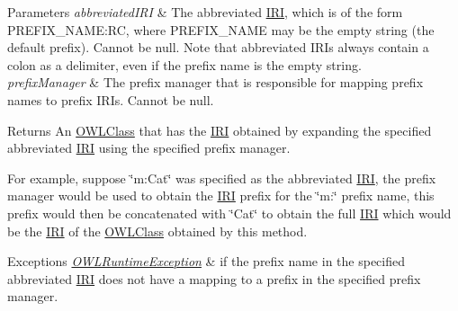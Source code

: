 \begin{DoxyParams}{Parameters}
{\em abbreviated\-I\-R\-I} & The abbreviated \hyperlink{classorg_1_1semanticweb_1_1owlapi_1_1model_1_1_i_r_i}{I\-R\-I}, which is of the form P\-R\-E\-F\-I\-X\-\_\-\-N\-A\-M\-E\-:R\-C, where P\-R\-E\-F\-I\-X\-\_\-\-N\-A\-M\-E may be the empty string (the default prefix). Cannot be null. Note that abbreviated I\-R\-Is always contain a colon as a delimiter, even if the prefix name is the empty string. \\
\hline
{\em prefix\-Manager} & The prefix manager that is responsible for mapping prefix names to prefix I\-R\-Is. Cannot be null. \\
\hline
\end{DoxyParams}
\begin{DoxyReturn}{Returns}
An \hyperlink{interfaceorg_1_1semanticweb_1_1owlapi_1_1model_1_1_o_w_l_class}{O\-W\-L\-Class} that has the \hyperlink{classorg_1_1semanticweb_1_1owlapi_1_1model_1_1_i_r_i}{I\-R\-I} obtained by expanding the specified abbreviated \hyperlink{classorg_1_1semanticweb_1_1owlapi_1_1model_1_1_i_r_i}{I\-R\-I} using the specified prefix manager. 
\end{DoxyReturn}
For example, suppose \char`\"{}m\-:\-Cat\char`\"{} was specified as the abbreviated \hyperlink{classorg_1_1semanticweb_1_1owlapi_1_1model_1_1_i_r_i}{I\-R\-I}, the prefix manager would be used to obtain the \hyperlink{classorg_1_1semanticweb_1_1owlapi_1_1model_1_1_i_r_i}{I\-R\-I} prefix for the \char`\"{}m\-:\char`\"{} prefix name, this prefix would then be concatenated with \char`\"{}\-Cat\char`\"{} to obtain the full \hyperlink{classorg_1_1semanticweb_1_1owlapi_1_1model_1_1_i_r_i}{I\-R\-I} which would be the \hyperlink{classorg_1_1semanticweb_1_1owlapi_1_1model_1_1_i_r_i}{I\-R\-I} of the \hyperlink{interfaceorg_1_1semanticweb_1_1owlapi_1_1model_1_1_o_w_l_class}{O\-W\-L\-Class} obtained by this method. 
\begin{DoxyExceptions}{Exceptions}
{\em \hyperlink{classorg_1_1semanticweb_1_1owlapi_1_1model_1_1_o_w_l_runtime_exception}{O\-W\-L\-Runtime\-Exception}} & if the prefix name in the specified abbreviated \hyperlink{classorg_1_1semanticweb_1_1owlapi_1_1model_1_1_i_r_i}{I\-R\-I} does not have a mapping to a prefix in the specified prefix manager. \\
\hline
\end{DoxyExceptions}
